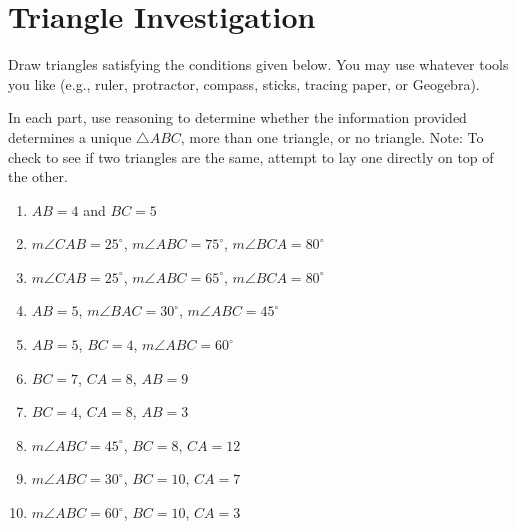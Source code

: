 \newpage

\section{Triangle Investigation}

\begin{prob}
Draw triangles satisfying the conditions given below.  You may use whatever tools you like (e.g., ruler, protractor, compass, sticks, tracing paper, or Geogebra).  

In each part, use reasoning to determine whether the information provided determines a unique $\triangle ABC$, more than one triangle, or no triangle.   Note:  To check to see if two triangles are the same, attempt to lay one directly on top of the other.  

\begin{enumerate}

\item $AB = 4$ and $BC = 5$
\item $m\angle CAB = 25^\circ$, $m\angle ABC = 75^\circ$, $m\angle BCA = 80^\circ$
\item $m\angle CAB = 25^\circ$, $m\angle ABC = 65^\circ$, $m\angle BCA = 80^\circ$
\item $AB = 5$, $m\angle BAC = 30^\circ$, $m\angle ABC = 45^\circ$
\item $AB = 5$, $BC = 4$, $m\angle ABC = 60^\circ$
\item $BC = 7$, $CA = 8$, $AB = 9$
\item $BC = 4$, $CA = 8$, $AB = 3$
\item $m\angle ABC = 45^\circ$, $BC = 8$, $CA = 12$
\item $m\angle ABC = 30^\circ$, $BC = 10$, $CA = 7$
\item $m\angle ABC = 60^\circ$, $BC = 10$, $CA = 3$

\end{enumerate}

\end{prob}
